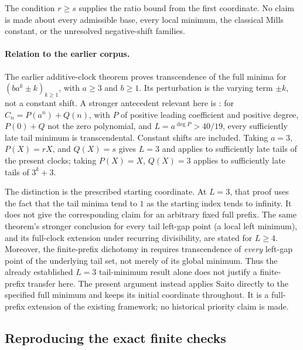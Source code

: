 \documentclass[11pt,a4paper]{article}
\theoremstyle{definition}\newtheorem{definition}[theorem]{Definition}
\theoremstyle{remark}\newtheorem{remark}[theorem]{Remark}
\begin{document}
The condition $r\ge s$ supplies the ratio bound from the first coordinate.
No claim is made about every admissible base, every local minimum,
the classical Mills constant, or the unresolved negative-shift families.

\paragraph{Relation to the earlier corpus.}
The earlier additive-clock theorem
\cite[Section~6, Theorem~6.1]{R07-K008} proves transcendence of the full
minima for $(ba^k\pm k)_{k\ge1}$, with $a\ge3$ and $b\ge1$.
Its perturbation is the varying term $\pm k$, not a constant shift.
A stronger antecedent relevant here is
\cite[Section~27, Theorem~27.2]{K031}: for
$C_n=P(a^n)+Q(n)$, with $P$ of positive leading coefficient and
positive degree, $P(0)+Q$ not the zero polynomial, and
$L=a^{\deg P}>40/19$, every sufficiently late tail minimum is
transcendental. Constant shifts are included. Taking
$a=3$, $P(X)=rX$, and $Q(X)=s$ gives $L=3$ and applies to sufficiently
late tails of the present clocks; taking $P(X)=X$, $Q(X)=3$ applies
to sufficiently late tails of $3^k+3$.

The distinction is the prescribed starting coordinate. At $L=3$,
that proof uses the fact that the tail minima tend to $1$ as the
starting index tends to infinity. It does not give the corresponding
claim for an arbitrary fixed full prefix. The same theorem's stronger
conclusion for every tail left-gap point (a local left minimum), and
its full-clock extension under recurring divisibility, are stated for
$L\ge4$. Moreover, the finite-prefix dichotomy in
\cite[Section~27, Theorem~27.1]{K031} requires transcendence of
\emph{every} left-gap point of the underlying tail set, not merely
of its global minimum. Thus the already established $L=3$ tail-minimum
result alone does not justify a finite-prefix transfer here.
The present argument instead applies Saito directly to the specified
full minimum and keeps its initial coordinate throughout. It is a
full-prefix extension of the existing framework; no historical
priority claim is made.


\subsection{Reproducing the exact finite checks}\label{R07:app:reproduce}
\end{document}

